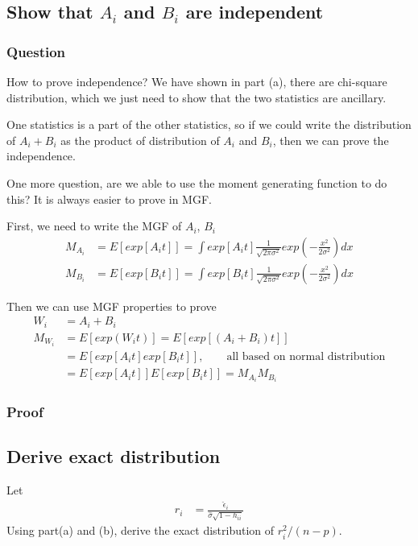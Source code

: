 \documentclass[11pt]{article} %
\begin{document}
\subsection{Show that $A_i$ and $B_i$ are independent}

\subsubsection{Question}
How to prove independence? We have shown in part (a), there are chi-square distribution, which we just need to show that the two statistics are ancillary.

One statistics is a part of the other statistics, so if we could write the distribution of $A_i + B_i$ as the product of distribution of $A_i$ and $B_i$, then we can prove the independence. 

One more question, are we able to use the moment generating function to do this? It is always easier to prove in MGF.

First, we need to write the MGF of $A_i$, $B_i$
\begin{align*}
	M_{A_i} & =E[exp[A_i t]] = \int exp[A_i t] \frac{1}{\sqrt{2 \pi \sigma^2}} exp(-\frac{x^2}{2 \sigma^2}) dx\\
	M_{B_i} & =E[exp[B_i t]] = \int exp[B_i t] \frac{1}{\sqrt{2 \pi \sigma^2}} exp(-\frac{x^2}{2 \sigma^2}) dx
\end{align*} 

Then we can use MGF properties to prove
\begin{align*}
	W_i & = A_i + B_i\\
	M_{W_i} &= E[exp(W_i t)] = E[exp[(A_i + B_i) t]] \\
	&= E[exp[A_i t] exp[B_i t]], \qquad \text{all based on normal distribution} \\
	&= E[exp[A_i t]] E[exp[B_i t]] = M_{A_i} M_{B_i}
\end{align*} 


\subsubsection{Proof}


\subsection{Derive exact distribution}
Let
\begin{align*}
	r_i & = \frac{\hat{\epsilon}_i}{\hat{\sigma} \sqrt{1- h_{ii}}}
\end{align*} 
Using part(a) and (b), derive the exact distribution of $r_i^2/ (n-p)$.
\end{document}
